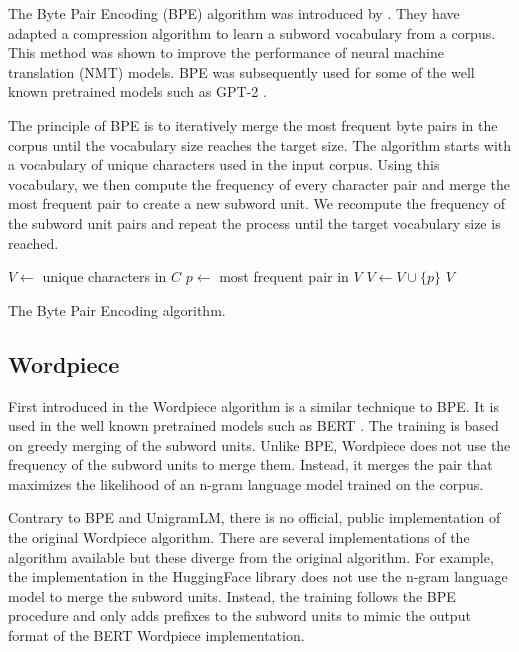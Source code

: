 The Byte Pair Encoding (BPE) algorithm was introduced by \citet{Sennrich2015}. They have adapted a compression algorithm  to learn a subword vocabulary from a corpus. This method was shown to improve the performance of neural machine translation (NMT) models. BPE was subsequently used for some of the well known pretrained models such as GPT-2 \citep{Radford2019}.

The principle of BPE is to iteratively merge the most frequent byte pairs in the corpus until the vocabulary size reaches the target size. The algorithm starts with a vocabulary of unique characters used in the input corpus. Using this vocabulary, we then compute the frequency of every character pair and merge the most frequent pair to create a new subword unit. We recompute the frequency of the subword unit pairs and repeat the process until the target vocabulary size is reached.

\begin{algorithm}
    \begin{algorithmic}
        \State $V \gets$ unique characters in $C$
        \State $p \gets$ most frequent pair in $V$
        \State $V \gets V \cup \{p\}$
        \EndWhile
        \State \Return $V$
        \EndFunction
    \end{algorithmic}
    \caption{The Byte Pair Encoding algorithm.}
    \label{alg:bpe}
\end{algorithm}

\subsection{Wordpiece}

First introduced in \cite{SchusterandNakajima2012)} the Wordpiece algorithm is a similar technique to BPE. It is used in the well known pretrained models such as BERT \citep{Devlin2018}. The training is based on greedy merging of the subword units. Unlike BPE, Wordpiece does not use the frequency of the subword units to merge them. Instead, it merges the pair that maximizes the likelihood of an n-gram language model trained on the corpus.

Contrary to BPE and UnigramLM, there is no official, public implementation of the original Wordpiece algorithm. There are several implementations of the algorithm available but these diverge from the original algorithm. For example, the implementation in the HuggingFace library \citep{Wolf2019} does not use the n-gram language model to merge the subword units. Instead, the training follows the BPE procedure and only adds prefixes to the subword units to mimic the output format of the BERT Wordpiece implementation.

